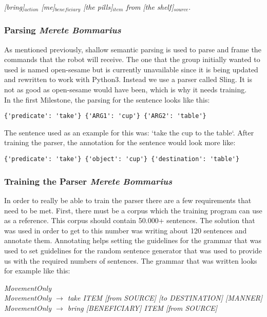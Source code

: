 \documentclass[main.tex]{subfiles}
\begin{document}
            \textit{ [bring]$_{action}$  [me]$_{beneficiary}$ [the pills]$_{item}$ from [the shelf]$_{source}.$}
        \subsubsection{Parsing \small{\textit{Merete Bommarius}}}     
            As mentioned previously, shallow semantic parsing is used to parse and frame the commands that the robot will receive. The one that the group initially wanted to used is named open-sesame but is currently unavailable since it is being updated and rewritten to work with Python3. Instead we use a parser called Sling. It is not as good as open-sesame would have been, which is why it needs training.\\ 
            In the first Milestone, the parsing for the sentence looks like this:
    
\begin{lstlisting}
{'predicate': 'take'} {'ARG1': 'cup'} {'ARG2': 'table'}
\end{lstlisting}
            
            The sentence used as an example for this was: ‘take the cup to the table‘. After training the parser, the annotation for the sentence would look more like:
            
\begin{lstlisting}
{'predicate': 'take'} {'object': 'cup'} {'destination': 'table'}
\end{lstlisting}
            
        \subsubsection{Training the Parser \small{\textit{Merete Bommarius}}}
            In order to really be able to train the parser there are a few requirements that need to be met. First, there must be a corpus which the training program can use as a reference. This corpus should contain 50.000+ sentences. The solution that was used in order to get to this number was writing about 120 sentences and annotate them. Annotating helps setting the guidelines for the grammar that was used to set guidelines for the random sentence generator that was used to provide us with the required numbers of sentences.
            The grammar that was written looks for example like this:
            
            
\textit{MovementOnly\\
                MovementOnly $\rightarrow$ take ITEM [from SOURCE] [to DESTINATION] [MANNER]\\
                MovementOnly $\rightarrow$ bring [BENEFICIARY] ITEM [from SOURCE]}
                
\end{document}
